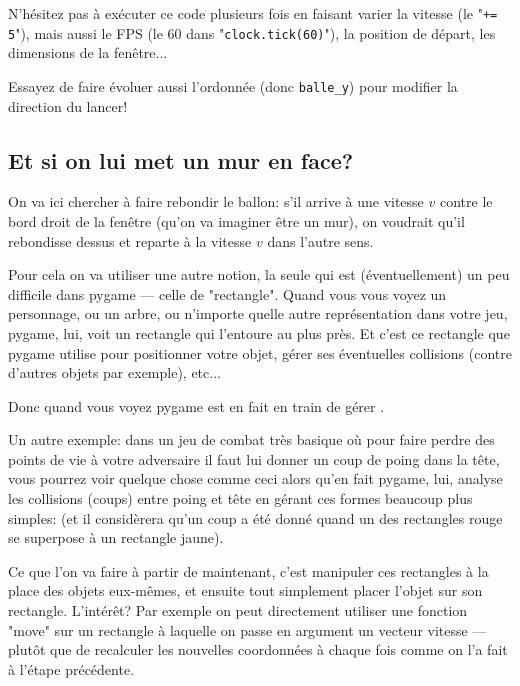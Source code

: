\documentclass[11pt]{article}
\begin{document}
	\begin{MonAct}
		N'hésitez pas à exécuter ce code plusieurs fois en faisant varier la vitesse (le "\texttt{+= 5}"), mais aussi le FPS (le 60 dans "\texttt{clock.tick(60)}"), la position de départ, les dimensions de la fenêtre...
		
		Essayez de faire évoluer aussi l'ordonnée (donc \texttt{balle\_y}) pour modifier la direction du lancer!
	\end{MonAct}
	
	\subsection*{Et si on lui met un mur en face?}
	On va ici chercher à faire rebondir le ballon: s'il arrive à une vitesse $v$ contre le bord droit de la fenêtre (qu'on va imaginer être un mur), on voudrait qu'il rebondisse dessus et reparte à la vitesse $v$ dans l'autre sens.
	
	Pour cela on va utiliser une autre notion, la seule qui est (éventuellement) un peu difficile dans pygame --- celle de "rectangle". Quand vous vous voyez un personnage, ou un arbre, ou n'importe quelle autre représentation dans votre jeu, pygame, lui, voit un rectangle qui l'entoure au plus près. Et c'est ce rectangle que pygame utilise pour positionner votre objet, gérer ses éventuelles collisions (contre d'autres objets par exemple), etc...
	
	Donc quand vous voyez  pygame est en fait en train de gérer .
	
	Un autre exemple: dans un jeu de combat très basique où pour faire perdre des points de vie à votre adversaire il faut lui donner un coup de poing dans la tête, vous pourrez voir quelque chose comme ceci  alors qu'en fait pygame, lui, analyse les collisions (coups) entre poing et tête en gérant ces formes beaucoup plus simples:  (et il considèrera qu'un coup a été donné quand un des rectangles rouge se superpose à un rectangle jaune).
	
	Ce que l'on va faire à partir de maintenant, c'est manipuler ces rectangles à la place des objets eux-mêmes, et ensuite tout simplement placer l'objet sur son rectangle. L'intérêt? Par exemple on peut directement utiliser une fonction "move" sur un rectangle à laquelle on passe en argument un vecteur vitesse --- plutôt que de recalculer les nouvelles coordonnées à chaque fois comme on l'a fait à l'étape précédente. 
	
\end{document}
